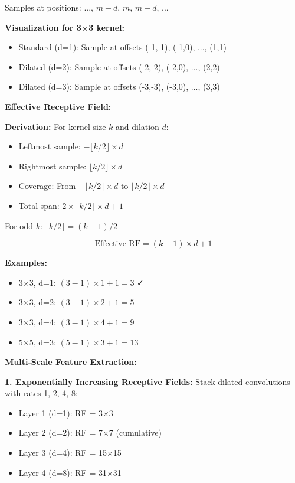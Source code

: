 \documentclass[12pt]{article}
\newcommand{\explanation}[1]{{\color{explanationcolor}#1}}
\begin{document}
\begin{enumerate}[(a)]
{{    Samples at positions: ..., $m-d$, $m$, $m+d$, ...
    
    \textbf{Visualization for 3×3 kernel:}
    \begin{itemize}
        \item Standard (d=1): Sample at offsets (-1,-1), (-1,0), ..., (1,1)
        \item Dilated (d=2): Sample at offsets (-2,-2), (-2,0), ..., (2,2)
        \item Dilated (d=3): Sample at offsets (-3,-3), (-3,0), ..., (3,3)
    \end{itemize}
    }
    
    \textbf{Effective Receptive Field:}
    
    \explanation{
    \textbf{Derivation:}
    For kernel size $k$ and dilation $d$:
    \begin{itemize}
        \item Leftmost sample: $-\lfloor k/2 \rfloor \times d$
        \item Rightmost sample: $\lfloor k/2 \rfloor \times d$
        \item Coverage: From $-\lfloor k/2 \rfloor \times d$ to $\lfloor k/2 \rfloor \times d$
        \item Total span: $2 \times \lfloor k/2 \rfloor \times d + 1$
    \end{itemize}
    
    For odd $k$: $\lfloor k/2 \rfloor = (k-1)/2$
    
    \[\boxed{\text{Effective RF} = (k-1) \times d + 1}\]
    
    \textbf{Examples:}
    \begin{itemize}
        \item 3×3, d=1: $(3-1) \times 1 + 1 = 3$ ✓
        \item 3×3, d=2: $(3-1) \times 2 + 1 = 5$
        \item 3×3, d=4: $(3-1) \times 4 + 1 = 9$
        \item 5×5, d=3: $(5-1) \times 3 + 1 = 13$
    \end{itemize}
    }
    
    \textbf{Multi-Scale Feature Extraction:}
    
    \explanation{
    \textbf{1. Exponentially Increasing Receptive Fields:}
    Stack dilated convolutions with rates 1, 2, 4, 8:
    \begin{itemize}
        \item Layer 1 (d=1): RF = 3×3
        \item Layer 2 (d=2): RF = 7×7 (cumulative)
        \item Layer 3 (d=4): RF = 15×15
        \item Layer 4 (d=8): RF = 31×31
    \end{itemize}
    
}}
\end{enumerate}
\end{document}
